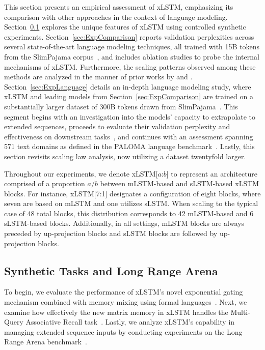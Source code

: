 This section presents an empirical assessment of xLSTM, emphasizing its comparison with other approaches in the context of language modeling. Section~\ref{sec:ExpSyntethic} explores the unique features of xLSTM using controlled synthetic experiments. 
Section~\ref{sec:ExpComparison} reports validation perplexities across several state-of-the-art language modeling techniques, all trained with 15B tokens from the SlimPajama corpus~\citep{Soboleva:23}, and includes ablation studies to probe the internal mechanisms of xLSTM. Furthermore, the scaling patterns observed among these methods are analyzed in the manner of prior works by \citet{Kaplan:20} and \citet{Brown:20short}. 
Section~\ref{sec:ExpLanguage} details an in-depth language modeling study, where xLSTM and leading models from Section~\ref{sec:ExpComparison} are trained on a substantially larger dataset of 300B tokens drawn from SlimPajama~\citep{Soboleva:23}. This segment begins with an investigation into the models’ capacity to extrapolate to extended sequences, proceeds to evaluate their validation perplexity and effectiveness on downstream tasks~\citep{Sutawika:24}, and continues with an assessment spanning 571 text domains as defined in the PALOMA language benchmark~\citep{Magnusson:23arxivshort}. Lastly, this section revisits scaling law analysis, now utilizing a dataset twentyfold larger.

\label{sec:xlstm_blocks_notation}
Throughout our experiments, we denote xLSTM[$a$:$b$] to represent an architecture comprised of a proportion $a/b$ between mLSTM-based and sLSTM-based xLSTM blocks. For instance, xLSTM[7:1] designates a configuration of eight blocks, where seven are based on mLSTM and one utilizes sLSTM. When scaling to the typical case of 48 total blocks, this distribution corresponds to 42 mLSTM-based and 6 sLSTM-based blocks. Additionally, in all settings, mLSTM blocks are always preceded by up-projection blocks and sLSTM blocks are followed by up-projection blocks.

\subsection{Synthetic Tasks and Long Range Arena}
\label{sec:ExpSyntethic}
To begin, we evaluate the performance of xLSTM’s novel exponential gating mechanism combined with memory mixing using formal languages~\citep{Deletang:23}. Next, we examine how effectively the new matrix memory in xLSTM handles the Multi-Query Associative Recall task~\citep{Arora:23arxiv}. Lastly, we analyze xLSTM's capability in managing extended sequence inputs by conducting experiments on the Long Range Arena benchmark~\citep{Tay:21}.

